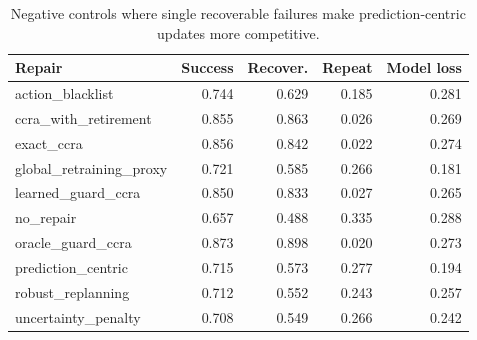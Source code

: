\begin{table}[t]
\centering
\caption{Negative controls where single recoverable failures make prediction-centric updates more competitive.}
\label{tab:negative-controls}
\small
\begin{tabular}{lrrrr}
\toprule
Repair & Success & Recover. & Repeat & Model loss \\
\midrule
action\_blacklist & 0.744 & 0.629 & 0.185 & 0.281 \\
ccra\_with\_retirement & 0.855 & 0.863 & 0.026 & 0.269 \\
exact\_ccra & 0.856 & 0.842 & 0.022 & 0.274 \\
global\_retraining\_proxy & 0.721 & 0.585 & 0.266 & 0.181 \\
learned\_guard\_ccra & 0.850 & 0.833 & 0.027 & 0.265 \\
no\_repair & 0.657 & 0.488 & 0.335 & 0.288 \\
oracle\_guard\_ccra & 0.873 & 0.898 & 0.020 & 0.273 \\
prediction\_centric & 0.715 & 0.573 & 0.277 & 0.194 \\
robust\_replanning & 0.712 & 0.552 & 0.243 & 0.257 \\
uncertainty\_penalty & 0.708 & 0.549 & 0.266 & 0.242 \\
\bottomrule
\end{tabular}
\end{table}
